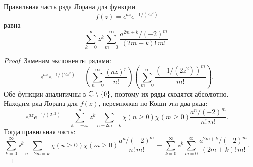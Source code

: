 \documentclass[../paper.tex]{subfiles}
\begin{document}
\begin{Lem}[Правильная часть ряда Лорана для $f(s) = e^{as} e^{-1/(2s^2)}$]
\label{laurent-2}
Правильная часть ряда Лорана для функции
\[
	f(z) = e^{az} e^{-1/(2z^2)}
\]
равна
\[
	\sum_{k=0}^{\infty} z^k \sum_{m=0}^{\infty} \frac{a^{2m+k} / (-2)^m}{(2m+k)!\,m!}
.\]
\end{Lem}

\begin{proof}
Заменим экспоненты рядами:
\[
	e^{az} e^{-1/(2z^2)}
	= \left( \sum_{n=0}^{\infty} \frac{(az)^n}{n!} \right)
		\left( \sum_{m=0}^{\infty} \frac{\left( -1 / \left( 2z^2 \right) \right)^m}{m!}  \right) 
.\]
Обе функции аналитичны в $\mathbb{C} \setminus \{0\}$, поэтому их ряды сходятся абсолютно.
Находим ряд Лорана для $f(z)$, перемножая по Коши эти два ряда:
\[
	e^{az} e^{-1/(2z^2)}
	= \sum_{k=-\infty}^{\infty} z^k \sum_{n-2m=k} \chi(n \ge 0) \chi(m \ge 0) \frac{a^n / (-2)^m}{n!\,m!}
.\]
Тогда правильная часть:
\[
    \sum_{k=0}^{\infty} z^k \sum_{n-2m=k} \chi(n \ge 0) \chi(m \ge 0) \frac{a^n / (-2)^m}{n!\,m!} =
    \sum_{k=0}^{\infty} z^k \sum_{m=0}^{\infty} \frac{a^{2m+k} / (-2)^m}{(2m+k)!\,m!}
.\]
\end{proof}
\end{document}
